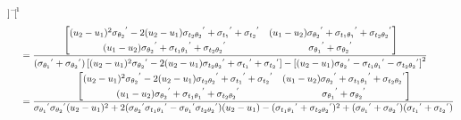 \documentclass[a4paper,landscape]{article}
\begin{document}
\begin{align*}
\begin{bmatrix}
            \end{bmatrix}^{-1}
            \\[0.3em]
            &=
            \cfrac
            {
            \begin{bmatrix}
                 (u_2-u_1)^2{\sigma_{\theta_2}}^{'}-2(u_2-u_1){\sigma_{t_2\theta_2}}^{'} + {\sigma_{t_1}}^{'} + {\sigma_{t_2}}^{'}
                 &  (u_1-u_2){\sigma_{\theta_2}}^{'} +{\sigma_{t_1\theta_1}}^{'} +{\sigma_{t_2\theta_2}}^{'}\\[0.3em]
                (u_1-u_2){\sigma_{\theta_2}}^{'} + {\sigma_{t_1\theta_1}}^{'} + {\sigma_{t_2\theta_2}}^{'}
                & {\sigma_{\theta_1}}^{'} + {\sigma_{\theta_2}}^{'}
            \end{bmatrix}
            }
            {
            \left(
            {\sigma_{\theta_1}}^{'} + {\sigma_{\theta_2}}^{'}
            \right)
            \left[
            (u_2-u_1)^2{\sigma_{\theta_2}}^{'}-2(u_2-u_1){\sigma_{t_2\theta_2}}^{'} + {\sigma_{t_1}}^{'} + {\sigma_{t_2}}^{'}
            \right]
            -
            \left[
            (u_2-u_1){\sigma_{\theta_2}}^{'} - {\sigma_{t_1\theta_1}}^{'} - {\sigma_{t_2\theta_2}}^{'}
            \right]^2
            }
            \\
            &=
            \cfrac
            {
            \begin{bmatrix}
                 (u_2-u_1)^2{\sigma_{\theta_2}}^{'}-2(u_2-u_1){\sigma_{t_2\theta_2}}^{'} + {\sigma_{t_1}}^{'} + {\sigma_{t_2}}^{'}
                 &  (u_1-u_2){\sigma_{\theta_2}}^{'} +{\sigma_{t_1\theta_1}}^{'} +{\sigma_{t_2\theta_2}}^{'}\\[0.3em]
                (u_1-u_2){\sigma_{\theta_2}}^{'} + {\sigma_{t_1\theta_1}}^{'} + {\sigma_{t_2\theta_2}}^{'}
                & {\sigma_{\theta_1}}^{'} + {\sigma_{\theta_2}}^{'}
            \end{bmatrix}
            }
            {
            {\sigma_{\theta_1}}^{'}{\sigma_{\theta_2}}^{'}(u_2-u_1)^2
            + 2( {\sigma_{\theta_2}}^{'}{\sigma_{t_1\theta_1}}^{'} - {\sigma_{\theta_1}}^{'}{\sigma_{t_2\theta_2}}^{'})(u_2-u_1)
            - ({\sigma_{t_1\theta_1}}^{'}+{\sigma_{t_2\theta_2}}^{'})^2
            + ({\sigma_{\theta_1}}^{'}+{\sigma_{\theta_2}}^{'})({\sigma_{t_1}}^{'}+{\sigma_{t_2}}^{'})
            }
        \end{align*}
\end{document}
